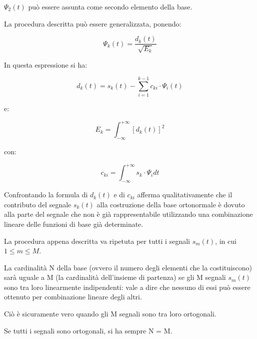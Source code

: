 $\Psi_2 (t)$ può essere assunta come secondo elemento della base. \newline 

La procedura descritta può essere generalizzata, ponendo: 

{
    \Large 
    \begin{equation}
        \Psi_k (t) = \frac{d_k (t)}{\sqrt{E_k}}
    \end{equation}
} 

In questa espressione si ha: 

{
    \Large 
    \begin{equation}
        d_k (t)
        = 
        s_k (t) 
        - 
        \sum_{i = 1}^{k-1}
        c_{ki} \cdot \Psi_i (t)
    \end{equation}
}

e: 

{
    \Large 
    \begin{equation}
        E_k = \int_{- \infty}^{+ \infty} \left[ d_k (t) \right]^{2}
    \end{equation}
}

con: 

{
    \Large 
    \begin{equation}
        c_{ki}
        = 
        \int_{-\infty}^{+ \infty}
        s_k \cdot \Psi_{i} dt
    \end{equation}
}


Confrontando la formula di $d_k (t)$ e di $c_{ki}$ afferma qualitativamente che il contributo del segnale $s_k (t)$ alla costruzione della base ortonormale 
è dovuto alla parte del segnale che non è già rappresentabile utilizzando una combinazione lineare delle funzioni di base già determinate. \newline 

La procedura appena descritta va ripetuta per tutti i segnali $s_m (t)$, in cui $1 \le m \le M$. \newline 

La cardinalità N della base (ovvero il numero degli elementi che la costituiscono) sarà uguale a M (la cardinalità dell'insieme di partenza) 
se gli M segnali $s_m (t)$ sono tra loro linearmente indipendenti: 
vale a dire che nessuno di essi può essere ottenuto per combinazione lineare degli altri. \newline 

Ciò è sicuramente vero quando gli M segnali sono tra loro ortogonali. \newline 

Se tutti i segnali sono ortogonali, si ha sempre N = M. \newline 

